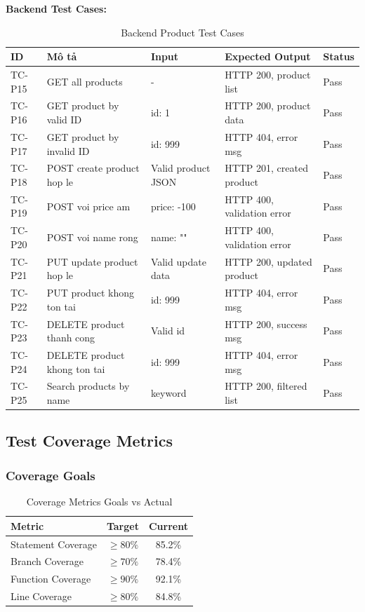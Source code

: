 \textbf{Backend Test Cases:}
\begin{table}[H]
\centering
\small
\begin{tabular}{|p{1cm}|p{3.5cm}|p{3cm}|p{3.5cm}|p{1.5cm}|}
\hline
\textbf{ID} & \textbf{Mô tả} & \textbf{Input} & \textbf{Expected Output} & \textbf{Status} \\
\hline
TC-P15 & GET all products & - & HTTP 200, product list & Pass \\
\hline
TC-P16 & GET product by valid ID & id: 1 & HTTP 200, product data & Pass \\
\hline
TC-P17 & GET product by invalid ID & id: 999 & HTTP 404, error msg & Pass \\
\hline
TC-P18 & POST create product hop le & Valid product JSON & HTTP 201, created product & Pass \\
\hline
TC-P19 & POST voi price am & price: -100 & HTTP 400, validation error & Pass \\
\hline
TC-P20 & POST voi name rong & name: "" & HTTP 400, validation error & Pass \\
\hline
TC-P21 & PUT update product hop le & Valid update data & HTTP 200, updated product & Pass \\
\hline
TC-P22 & PUT product khong ton tai & id: 999 & HTTP 404, error msg & Pass \\
\hline
TC-P23 & DELETE product thanh cong & Valid id & HTTP 200, success msg & Pass \\
\hline
TC-P24 & DELETE product khong ton tai & id: 999 & HTTP 404, error msg & Pass \\
\hline
TC-P25 & Search products by name & keyword & HTTP 200, filtered list & Pass \\
\hline
\end{tabular}
\caption{Backend Product Test Cases}
\end{table}

\subsection{Test Coverage Metrics}

\subsubsection{Coverage Goals}
\begin{table}[H]
\centering
\begin{tabular}{|l|c|c|}
\hline
\textbf{Metric} & \textbf{Target} & \textbf{Current} \\
\hline
Statement Coverage & $\geq 80\%$ & 85.2\% \\
\hline
Branch Coverage & $\geq 70\%$ & 78.4\% \\
\hline
Function Coverage & $\geq 90\%$ & 92.1\% \\
\hline
Line Coverage & $\geq 80\%$ & 84.8\% \\
\hline
\end{tabular}
\caption{Coverage Metrics Goals vs Actual}
\end{table}

